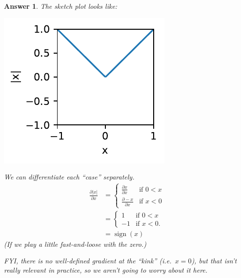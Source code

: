 \documentclass{article}
\newtheorem{answer}{Answer}
\newcommand{\dd}[2][]{\frac{\partial #1}{\partial #2}}
\begin{document}
\begin{answer}
  The sketch plot looks like:

  \includegraphics{abs.pdf}

  We can differentiate each ``case'' separately.
  \begin{align}
    \dd[| x |]{x} &= \begin{cases}
      \dd[x]{x} & \text{if } 0 < x\\
    \dd[-x]{x} & \text{if } x < 0
  \end{cases}\\
  &= \begin{cases}
     1 & \text{if } 0 < x\\
    -1 & \text{if } x < 0.
  \end{cases} \\
  &= \operatorname{sign}(x)
  \end{align}
  (If we play a little fast-and-loose with the zero.)

  FYI, there is no well-defined gradient at the ``kink'' (i.e.\ $x=0$), but that isn't really relevant in practice, so we aren't going to worry about it here.
\end{answer}
\end{document}
